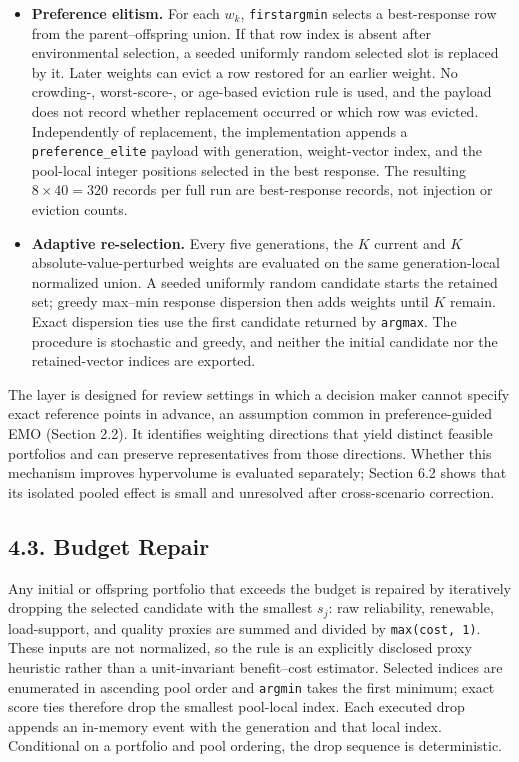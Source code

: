 \documentclass[
  10pt,
  a4paper,
]{article}
\begin{document}
\begin{itemize}
\item
  \textbf{Preference elitism.} For each \(w_k\), \texttt{firstargmin}
  selects a best-response row from the parent--offspring union. If that
  row index is absent after environmental selection, a seeded uniformly
  random selected slot is replaced by it. Later weights can evict a row
  restored for an earlier weight. No crowding-, worst-score-, or
  age-based eviction rule is used, and the payload does not record
  whether replacement occurred or which row was evicted. Independently
  of replacement, the implementation appends a
  \texttt{preference\_elite} payload with generation, weight-vector
  index, and the pool-local integer positions selected in the best
  response. The resulting \(8\times40=320\) records per full run are
  best-response records, not injection or eviction counts.
\item
  \textbf{Adaptive re-selection.} Every five generations, the \(K\)
  current and \(K\) absolute-value-perturbed weights are evaluated on
  the same generation-local normalized union. A seeded uniformly random
  candidate starts the retained set; greedy max--min response dispersion
  then adds weights until \(K\) remain. Exact dispersion ties use the
  first candidate returned by \texttt{argmax}. The procedure is
  stochastic and greedy, and neither the initial candidate nor the
  retained-vector indices are exported.
\end{itemize}

The layer is designed for review settings in which a decision maker
cannot specify exact reference points in advance, an assumption common
in preference-guided EMO (Section 2.2). It identifies weighting
directions that yield distinct feasible portfolios and can preserve
representatives from those directions. Whether this mechanism improves
hypervolume is evaluated separately; Section 6.2 shows that its isolated
pooled effect is small and unresolved after cross-scenario correction.

\subsection{4.3. Budget Repair}\label{budget-repair}

Any initial or offspring portfolio that exceeds the budget is repaired
by iteratively dropping the selected candidate with the smallest
\(s_j\): raw reliability, renewable, load-support, and quality proxies
are summed and divided by \texttt{max(cost,\ 1)}. These inputs are not
normalized, so the rule is an explicitly disclosed proxy heuristic
rather than a unit-invariant benefit--cost estimator. Selected indices
are enumerated in ascending pool order and \texttt{argmin} takes the
first minimum; exact score ties therefore drop the smallest pool-local
index. Each executed drop appends an in-memory event with the generation
and that local index. Conditional on a portfolio and pool ordering, the
drop sequence is deterministic.
\end{document}
